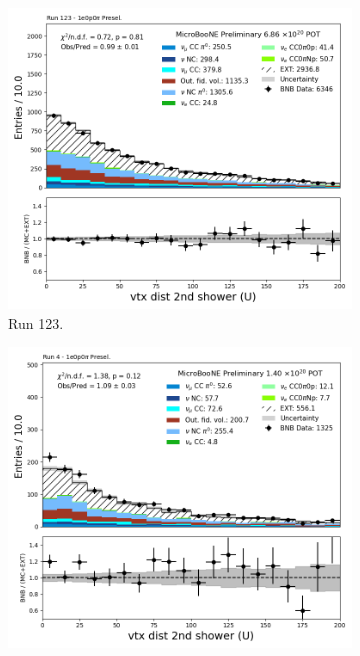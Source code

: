 \begin{figure}[H]
    \centering
    \begin{subfigure}[t]{0.32\linewidth}
        \includegraphics[width=\linewidth]{technote/Appendix_Preselection/Figures/1e0p0pi/Run123/secondshower_U_vtxdist_Run123_1e0p0pi_Presel.png}
        \caption{Run 123.}
    \end{subfigure}%
    \hspace{0.2cm}%
    \begin{subfigure}[t]{0.32\linewidth}
        \includegraphics[width=\linewidth]{technote/Appendix_Preselection/Figures/1e0p0pi/Run4b/secondshower_U_vtxdist_Run4b_1e0p0pi_Presel.png}

\end{subfigure}
\end{figure}
